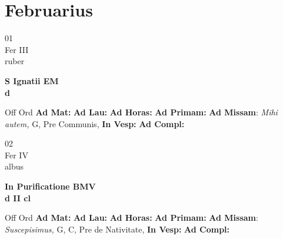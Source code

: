 \documentclass[10pt, openany]{book}
\begin{document}
    \chapter{Februarius}
                    
    \begin{center}
        \begin{minipage}{3.5in}
            \vspace{2em}
            \begin{minipage}{0.5in}
                {\Huge 01} \\
                {\normalsize Fer III} \\
                {\normalsize ruber}
            \end{minipage}
            \begin{minipage}{3.0in}
                \textbf{ \large S Ignatii EM \\
                \textnormal{\normalsize d}} \\ 
            \end{minipage}
            \begin{justify}Off Ord
                \textbf{Ad Mat: }
                \textbf{Ad Lau: }
                \textbf{Ad Horas: }
                \textbf{Ad Primam: }\textbf{Ad Missam}: \textit{Mihi autem,} G, Pre Communis,  
                \textbf{In Vesp: }
                \textbf{Ad Compl: }
            \end{justify}
        \end{minipage}
    \end{center}

    \begin{center}
        \begin{minipage}{3.5in}
            \vspace{2em}
            \begin{minipage}{0.5in}
                {\Huge 02} \\
                {\normalsize Fer IV} \\
                {\normalsize albus}
            \end{minipage}
            \begin{minipage}{3.0in}
                \textbf{ \large In Purificatione BMV \\
                \textnormal{\normalsize d II cl}} \\ 
            \end{minipage}
            \begin{justify}Off Ord
                \textbf{Ad Mat: }
                \textbf{Ad Lau: }
                \textbf{Ad Horas: }
                \textbf{Ad Primam: }\textbf{Ad Missam}: \textit{Suscepisimus,} G, C, Pre de Nativitate,  
                \textbf{In Vesp: }
                \textbf{Ad Compl: }
            \end{justify}
        \end{minipage}
    \end{center}
\end{document}

